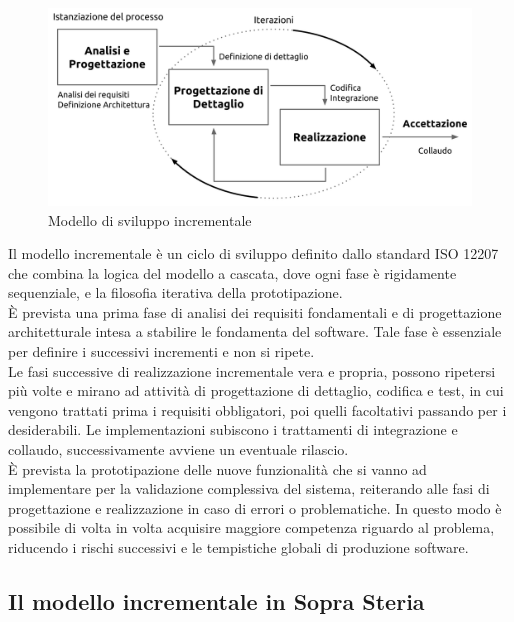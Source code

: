 	\begin{figure}[H]
		\centering
	   	\includegraphics[width=1\textwidth]{immagini/modello_incrementale}
	   	\caption{Modello di sviluppo incrementale}
	\end{figure}
	
	Il modello incrementale è un ciclo di sviluppo definito dallo standard ISO 12207 che combina la logica del modello a cascata, dove ogni fase è rigidamente sequenziale, e la filosofia iterativa della prototipazione.\\
	
	È prevista una prima fase di analisi dei requisiti fondamentali e di progettazione architetturale intesa a stabilire le fondamenta del software. Tale fase è essenziale per definire i successivi incrementi e non si ripete.\\
	
	Le fasi successive di realizzazione incrementale vera e propria, possono ripetersi più volte e mirano ad attività di progettazione di dettaglio, codifica e test, in cui vengono trattati prima i requisiti obbligatori, poi quelli facoltativi passando per i desiderabili. Le implementazioni subiscono i trattamenti di integrazione e collaudo, successivamente avviene un eventuale rilascio.\\

	È prevista la prototipazione delle nuove funzionalità che si vanno ad implementare per la validazione complessiva del sistema, reiterando 
	alle fasi di progettazione e realizzazione in caso di errori o problematiche. In questo modo è possibile di volta in volta acquisire maggiore competenza riguardo al problema, riducendo i rischi successivi e le tempistiche globali di produzione software.
	
	\subsection{Il modello incrementale in Sopra Steria}
	
